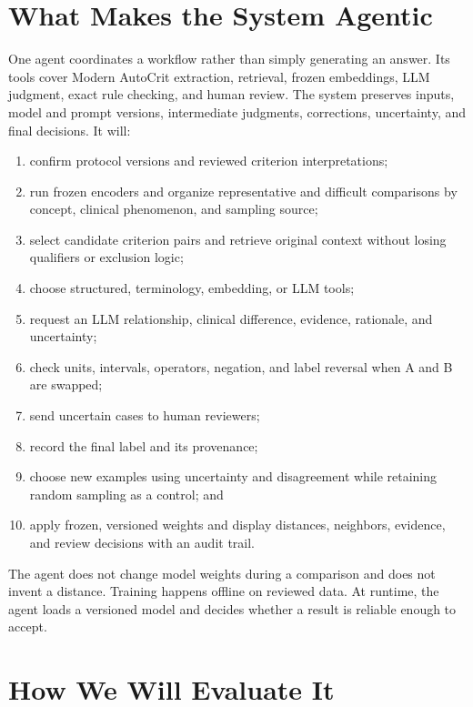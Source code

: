\documentclass[11pt]{article}
\begin{document}
\section{What Makes the System Agentic}

One agent coordinates a workflow rather than simply generating an answer. Its tools cover Modern AutoCrit extraction, retrieval, frozen embeddings, LLM judgment, exact rule checking, and human review. The system preserves inputs, model and prompt versions, intermediate judgments, corrections, uncertainty, and final decisions. It will:

\begin{enumerate}
    \item confirm protocol versions and reviewed criterion interpretations;
    \item run frozen encoders and organize representative and difficult comparisons by concept, clinical phenomenon, and sampling source;
    \item select candidate criterion pairs and retrieve original context without losing qualifiers or exclusion logic;
    \item choose structured, terminology, embedding, or LLM tools;
    \item request an LLM relationship, clinical difference, evidence, rationale, and uncertainty;
    \item check units, intervals, operators, negation, and label reversal when A and B are swapped;
    \item send uncertain cases to human reviewers;
    \item record the final label and its provenance;
    \item choose new examples using uncertainty and disagreement while retaining random sampling as a control; and
    \item apply frozen, versioned weights and display distances, neighbors, evidence, and review decisions with an audit trail.
\end{enumerate}

The agent does not change model weights during a comparison and does not invent a distance. Training happens offline on reviewed data. At runtime, the agent loads a versioned model and decides whether a result is reliable enough to accept.

\section{How We Will Evaluate It}
\end{document}
